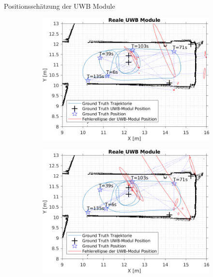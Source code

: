 \documentclass{beamer}
\begin{document}
%
%
\begin{frame}{Positionsschätzung der UWB Module}

	\begin{figure}
		\centering
		\begin{subfigure}{0.41\linewidth}
			\centering
			\includegraphics[width=\linewidth]{Record_2018-02-08-12-33-53_filtered_3_beacon_error}
		\end{subfigure}
		\hfill
		\begin{subfigure}{0.41\linewidth}
			\centering
			\includegraphics[width=\linewidth]{Record_2018-02-08-12-33-53_filtered_1_beacon_error}

\end{subfigure}
\end{figure}
\end{frame}
\end{document}
